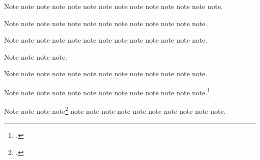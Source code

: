 \documentclass[a4paper,12pt]{report}
\begin{document}
Note\autocite{ac:comment} note\autocite{adorno:benj}
note\autocite{aristotle:metaphy:gr} note\autocite{adorno:benj}
note\autocite[23]{adorno:benj} note\autocite{ashbrook:brain}
note\autocite[3.2.996b5--8]{aristotle:metaphy:gr}
note\autocite{ac:comment} note\autocite{assocpress:gun}
note\autocite{auden:reading} note\autocite[149]{ashbrook:brain}
note\autocite{author:forthcoming} note\autocite{assocpress:gun}
note\autocite{babb:peru}.

Note\autocite{author:forthcoming} note\autocite{auden:reading}
note\autocite{barcott:review} note\autocite{batson}
note\autocite{babb:peru} note\autocite{barcott:review}
note\autocite[339]{batson} note\autocite{beattie:crime}
note\autocite{bedford:photo} note\autocite{babb:peru}
note\autocite{beethoven:sonata29} note\autocite{bernhard:boris}
note\autocite{bernhard:ritter}.

Note\autocite{bernstein:shostakovich} note\autocite{boxer:china}
note\autocite{beattie:crime}  note\autocite{brown:bremer}
note\autocite{beethoven:sonata29} note\autocite{bernhard:ritter}
note\autocite{bernstein:shostakovich} note\autocite{bernhard:boris}
note\autocite{boxer:china} note\autocite{browning:aurora}
note\autocite[pt.\ 2, 55]{brown:bremer} note\autocite{bundy:macneil}
note\autocite{centinel:letters}.

Note\autocite{chaucer:liferecords} note\autocite{browning:aurora}
note\autocite[\printdate]{bundy:macneil}
note\autocite[29]{centinel:letters}.

Note\autocite{chaucer:alt} note\autocite{clark:mesopot}
note\autocite{chaucer:liferecords} note\autocite{cleese:holygrail}
note\autocite{Clemens:letter} note\autocite{cohen:schiff}
note\autocite{Clemens:letter} note\autocite{clark:mesopot}
note\autocite{cleese:holygrail} note\autocite{cohen:schiff}
note\autocite{chaucer:alt} note\autocite{conley:fifthgrade}
note\autocite{contrib:contrib}.

Note\autocite{conley:fifthgrade} note\autocite{contrib:contrib}
note\autocite{cook:sotweed} note\autocite{cotton:manufacture}
note\autocite{coolidge:speech} note\autocite{cook:sotweed}
note\autocite{creasey:ashe:blast} note\autocite{creasey:york:death}
note\autocite{cotton:manufacture} note\autocite{creasey:morton:hide}
note\autocite{coolidge:speech} note\autocite{creasey:ashe:blast}
note.\footnote{.}

Note\autocite{davenport:attention} note\autocite{creasey:york:death}
note\autocite{creasey:morton:hide}
note\footnote{.}
note\autocite{dinkel:agassiz} note\autocite{donne:var}
note\autocite{davenport:attention} note\autocite{dunn:revolutions}
note\autocite{dyna:browser} note\autocite{dinkel:agassiz}
note\autocite{eliot:pound} note\autocite{ellet:galena}
note\autocite{donne:var} note\autocite{dyna:browser}.
\end{document}
